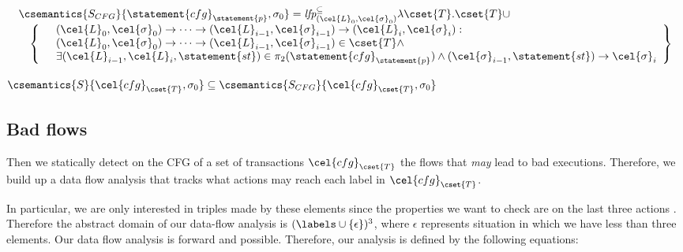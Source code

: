 \[
\begin{array}{l}
\csemantics{S_{CFG}}{\statement{cfg}_\statement{p}, \sigma_0} = \textit{lfp}_{(\cel{L}_0, \cel{\sigma}_0)}^{\subseteq} \lambda \cset{T} . \cset{T} \cup\\
\hspace{10pt} \left\{
\begin{array}{l}
\hspace{10pt} (\cel{L}_0, \cel{\sigma}_0) \to \cdots \to (\cel{L}_{i-1}, \cel{\sigma}_{i-1}) \to (\cel{L}_i, \cel{\sigma}_i) :\\
\hspace{10pt} (\cel{L}_0, \cel{\sigma}_0) \to \cdots \to (\cel{L}_{i-1}, \cel{\sigma}_{i-1})  \in \cset{T} \land\\
\hspace{10pt} \exists (\cel{L}_{i-1}, \cel{L}_i, \statement{st}) \in \pi_2(\statement{cfg}_\statement{p}) \land (\cel{\sigma}_{i-1}, \statement{st}) \to \cel{\sigma}_i\\
\end{array}
\right\}\\
\end{array}
\]



\begin{lemma}
	$\csemantics{S}{\cel{cfg}_{\cset{T}}, \sigma_0} \subseteq \csemantics{S_{CFG}}{\cel{cfg}_{\cset{T}}, \sigma_0}$
\end{lemma}


\subsection{Bad flows}
Then we statically detect on the CFG of a set of transactions $\cel{cfg}_{\cset{T}}$ the flows that \emph{may} lead to bad executions. Therefore, we build up a data flow analysis that tracks what actions may reach each label in $\cel{cfg}_{\cset{T}}$.

In particular, we are only interested in triples made by these elements since the properties we want to check are on the last three actions . Therefore the abstract domain of our data-flow analysis is $(\labels \cup \{\epsilon\})^3$, where $\epsilon$ represents situation in which we have less than three elements. Our data flow analysis is forward and possible. Therefore, our analysis is defined by the following equations:

